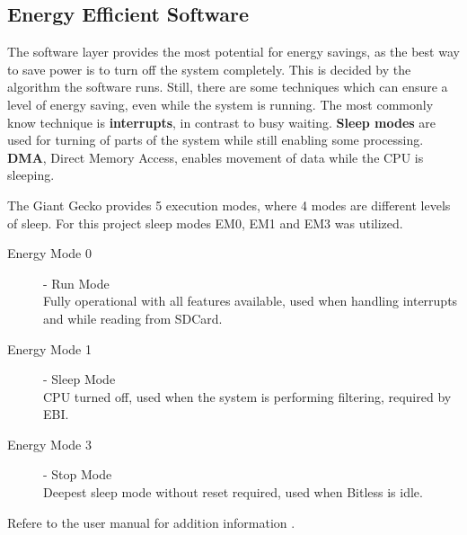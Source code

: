 \subsection{Energy Efficient Software}

The software layer provides the most potential for energy savings, as the best
way to save power is to turn off the system completely. This is decided by the
algorithm the software runs. Still, there are some techniques which can ensure
a level of energy saving, even while the system is running. The most commonly
know technique is {\bf interrupts}, in contrast to busy waiting. {\bf Sleep
modes} are used for turning of parts of the system while still enabling some
processing. {\bf DMA}, Direct Memory Access, enables movement of data while the
CPU is sleeping.

The Giant Gecko provides 5 execution modes, where 4 modes are different levels
of sleep. For this project sleep modes EM0, EM1 and EM3 was utilized.


\begin{description}
	\item[Energy Mode 0] - Run Mode \hfill \\
		Fully operational with all features available, used when handling
interrupts and while reading from SDCard.
	\item[Energy Mode 1] - Sleep Mode \hfill \\
		CPU turned off, used when the system is performing filtering, required
by EBI.
	\item[Energy Mode 3] - Stop Mode \hfill \\
		Deepest sleep mode without reset required, used when Bitless is idle.
\end{description}
Refere to the user manual for addition information \cite{efm32gg}.
